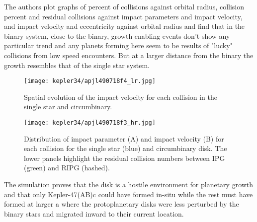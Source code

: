 The authors plot graphs of percent of collisions against orbital radius, collision percent and residual collisions against impact parameters and impact velocity, and impact velocity and eccentricity against orbital radius and find that in the binary system, close to the binary, growth enabling events don't show any particular trend and any planets forming here seem to be results of "lucky" collisions from low speed encounters. But at a larger distance from the binary the growth resembles that of the single star system. 
\\
\begin{figure}[h] 
    \centering
    \texttt{[image: kepler34/apjl490718f4\_lr.jpg]}
    \caption{Spatial evolution of the impact velocity for each collision in the single star and circumbinary.}
    \label{12}
\end{figure}

\begin{figure}[h] 
    \centering
    \texttt{[image: kepler34/apjl490718f3\_hr.jpg]}
    \caption{Distribution of impact parameter (A) and impact velocity (B) for each collision for the single star (blue) and circumbinary disk. The lower panels highlight the residual collision numbers between IPG (green) and RIPG (hashed).}
    \label{12}
\end{figure}
The simulation proves that the disk is a hostile environment for planetary growth and that only Kepler-47(AB)c could have formed in-situ while the rest must have formed at larger a where the protoplanetary disks were less perturbed by the binary stars and migrated inward to their current location.

